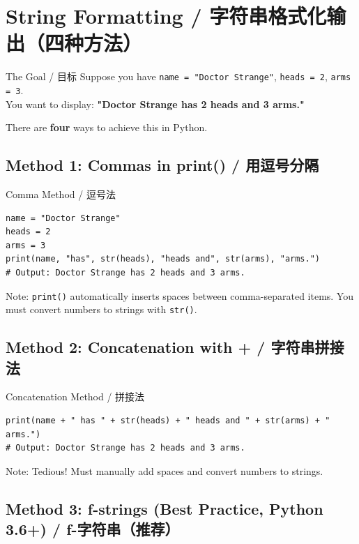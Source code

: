\documentclass[11pt,a4paper]{report}
\let\oldtexttt\texttt
\renewcommand{\texttt}[1]{\textcolor{mainblue}{\oldtexttt{#1}}}
\begin{document}
\section{String Formatting / 字符串格式化输出（四种方法）}

\begin{concept}{The Goal / 目标}
    Suppose you have \texttt{name = "Doctor Strange"}, \texttt{heads = 2}, \texttt{arms = 3}. \\
    You want to display: \textbf{"Doctor Strange has 2 heads and 3 arms."}

    There are \textbf{four} ways to achieve this in Python.
\end{concept}

\subsection{Method 1: Commas in print() / 用逗号分隔}

\begin{examplebox}{Comma Method / 逗号法}
\begin{lstlisting}
name = "Doctor Strange"
heads = 2
arms = 3
print(name, "has", str(heads), "heads and", str(arms), "arms.")
# Output: Doctor Strange has 2 heads and 3 arms.
\end{lstlisting}
    Note: \texttt{print()} automatically inserts spaces between comma-separated items. You must convert numbers to strings with \texttt{str()}.
\end{examplebox}

\subsection{Method 2: Concatenation with + / 字符串拼接法}

\begin{examplebox}{Concatenation Method / 拼接法}
\begin{lstlisting}
print(name + " has " + str(heads) + " heads and " + str(arms) + " arms.")
# Output: Doctor Strange has 2 heads and 3 arms.
\end{lstlisting}
    Note: Tedious! Must manually add spaces and convert numbers to strings.
\end{examplebox}

\subsection{Method 3: f-strings (Best Practice, Python 3.6+) / f-字符串（推荐）}
\end{document}
